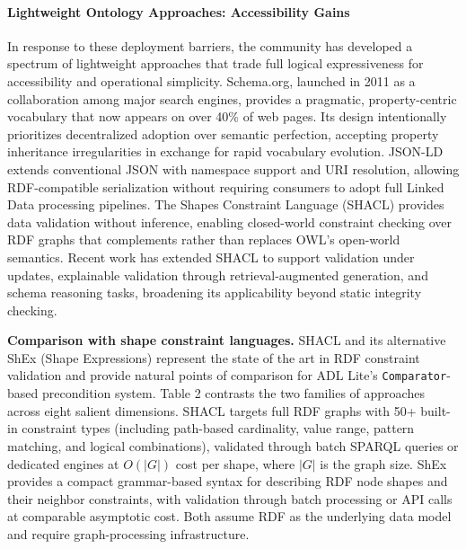 \paragraph{Lightweight Ontology Approaches: Accessibility Gains}\label{lightweight-ontology-approaches-accessibility-gains}

In response to these deployment barriers, the community has developed a spectrum of lightweight approaches that trade full logical expressiveness for accessibility and operational simplicity. Schema.org, launched in 2011 as a collaboration among major search engines, provides a pragmatic, property-centric vocabulary that now appears on over 40\% of web pages\cite{ref8}. Its design intentionally prioritizes decentralized adoption over semantic perfection, accepting property inheritance irregularities in exchange for rapid vocabulary evolution\cite{ref9}. JSON-LD\cite{ref10} extends conventional JSON with namespace support and URI resolution, allowing RDF-compatible serialization without requiring consumers to adopt full Linked Data processing pipelines. The Shapes Constraint Language (SHACL)\cite{ref11} provides data validation without inference, enabling closed-world constraint checking over RDF graphs that complements rather than replaces OWL's open-world semantics\cite{ref12}. Recent work has extended SHACL to support validation under updates\cite{ref13}, explainable validation through retrieval-augmented generation\cite{ref14}, and schema reasoning tasks\cite{ref12}, broadening its applicability beyond static integrity checking.

\textbf{Comparison with shape constraint languages.} SHACL and its alternative ShEx (Shape Expressions)\cite{ref48} represent the state of the art in RDF constraint validation and provide natural points of comparison for ADL Lite's \texttt{Comparator}-based precondition system. Table 2 contrasts the two families of approaches across eight salient dimensions. SHACL targets full RDF graphs with 50+ built-in constraint types (including path-based cardinality, value range, pattern matching, and logical combinations), validated through batch SPARQL queries or dedicated engines at \(O(|G|)\) cost per shape, where \(|G|\) is the graph size\cite{ref11}. ShEx provides a compact grammar-based syntax for describing RDF node shapes and their neighbor constraints, with validation through batch processing or API calls at comparable asymptotic cost\cite{ref48}. Both assume RDF as the underlying data model and require graph-processing infrastructure.

